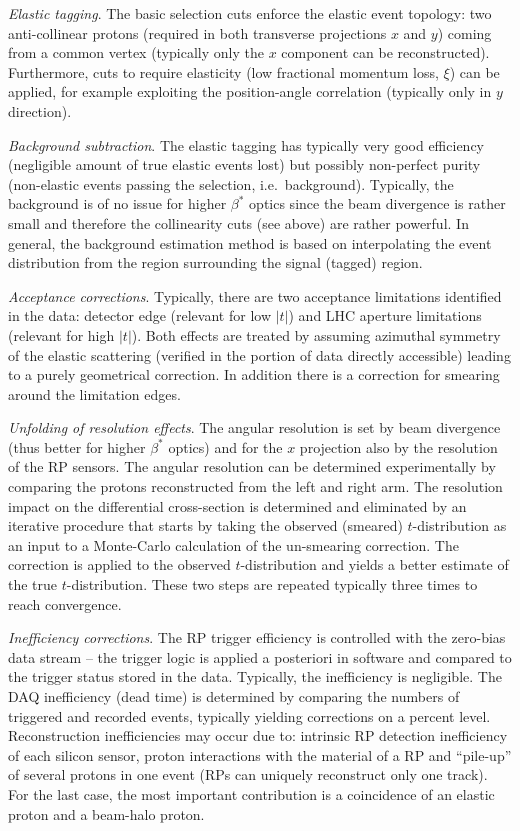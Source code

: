 \documentclass{desyproc}
\begin{document}
{\em Elastic tagging}. The basic selection cuts enforce the elastic event topology: two anti-collinear protons (required in both transverse projections $x$ and $y$) coming from a common vertex (typically only the $x$ component can be reconstructed). Furthermore, cuts to require elasticity (low fractional momentum loss, $\xi$) can be applied, for example exploiting the position-angle correlation (typically only in $y$ direction).

{\em Background subtraction}. The elastic tagging has typically very good efficiency (negligible amount of true elastic events lost) but possibly non-perfect purity (non-elastic events passing the selection, i.e.~background). Typically, the background is of no issue for higher $\beta^*$ optics since the beam divergence is rather small and therefore the collinearity cuts (see above) are rather powerful. In general, the background estimation method is based on interpolating the event distribution from the region surrounding the signal (tagged) region.

{\em Acceptance corrections}. Typically, there are two acceptance limitations identified in the data: detector edge (relevant for low $|t|$) and LHC aperture limitations (relevant for high $|t|$). Both effects are treated by assuming azimuthal symmetry of the elastic scattering (verified in the portion of data directly accessible) leading to a purely geometrical correction. In addition there is a correction for smearing around the limitation edges.

{\em Unfolding of resolution effects}. The angular resolution is set by beam divergence (thus better for higher $\beta^*$ optics) and for the $x$ projection also by the resolution of the RP sensors. The angular resolution can be determined experimentally by comparing the protons reconstructed from the left and right arm. The resolution impact on the differential cross-section is determined and eliminated by an iterative procedure that starts by taking the observed (smeared) $t$-distribution as an input to a Monte-Carlo calculation of the un-smearing correction. The correction is applied to the observed $t$-distribution and yields a better estimate of the true $t$-distribution. These two steps are repeated typically three times to reach convergence.

{\em Inefficiency corrections}. The RP trigger efficiency is controlled with the zero-bias data stream -- the trigger logic is applied a posteriori in software and compared to the trigger status stored in the data. Typically, the inefficiency is negligible. The DAQ inefficiency (dead time) is determined by comparing the numbers of triggered and recorded events, typically yielding corrections on a percent level. Reconstruction inefficiencies may occur due to: intrinsic RP detection inefficiency of each silicon sensor, proton interactions with the material of a RP and ``pile-up'' of several protons in one event (RPs can uniquely reconstruct only one track). For the last case, the most important contribution is a coincidence of an elastic proton and a beam-halo proton.
\end{document}
